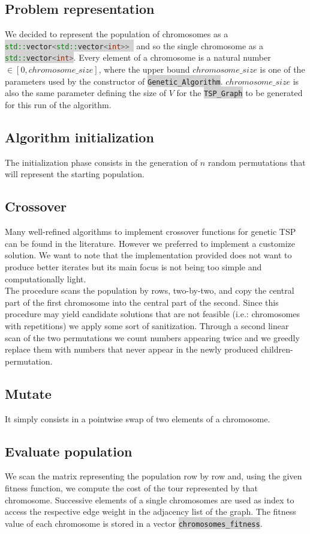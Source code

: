 \documentclass[11pt]{article}
\newcommand{\inlinecode}[2]{\colorbox{lightgray}{\lstinline[language=#1]$#2$}}
\begin{document}
\subsection{Problem representation}
We decided to represent the population of chromosomes as a
\inlinecode{C++}{std::vector<std::vector<int>> } and so the single chromosome as a \inlinecode{C++}{std::vector<int>}. Every element of a chromosome is a natural number $ \in [0, chromosome\_size] $, where the  upper bound $ chromosome\_size $ is one of the parameters used by the constructor of \inlinecode{C++}{Genetic_Algorithm}. $ chromosome\_size $ is also the same parameter defining the size of $ V $ for the \inlinecode{C++}{TSP_Graph} to be generated for this run of the algorithm.

\subsection{Algorithm initialization}
The initialization phase consists in the generation of $ n $ random permutations that will represent the starting population.

\subsection{Crossover}
Many well-refined algorithms to implement crossover functions for genetic TSP can be found in the literature. However we preferred to implement a customize solution. We want to note that the implementation provided does not want to produce better iterates but its main focus is not being too simple and computationally light.\\
The procedure scans the population by rows, two-by-two, and copy the central part of the first chromosome into the central part of the second. Since this procedure may yield candidate solutions that are not feasible (i.e.: chromosomes with repetitions) we apply some sort of sanitization. Through a second linear scan of the two permutations we count numbers appearing twice and we greedly replace them with numbers that never appear in the newly produced children-permutation.

\subsection{Mutate}
It simply consists in a pointwise swap of two elements of a chromosome.

\subsection{Evaluate population}
We scan the matrix representing the population row by row and, using the given fitness function, we compute the cost of the tour represented by that chromosome. Successive elements of a single chromosomes are used as index to access the respective edge weight in the adjacency list of the graph. The fitness value of each chromosome is stored in a vector \inlinecode{C++}{chromosomes_fitness}.
\end{document}
